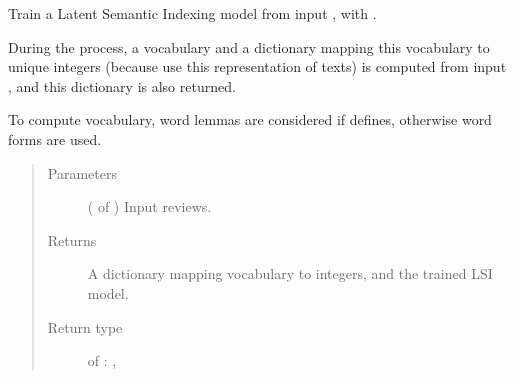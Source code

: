 \documentclass[letterpaper,10pt,english]{sphinxmanual}
\begin{document}
\begin{fulllineitems}
\label{\detokenize{learning:loacore.learning.lsi.lsi_model}}
Train a Latent Semantic Indexing model from input , with
.

During the process, a vocabulary and a dictionary mapping this vocabulary to unique integers
(because 
use this representation of texts) is computed from input , and this dictionary is also returned.

To compute vocabulary, word lemmas are considered if defines, otherwise word forms are used.
\begin{quote}\begin{description}
\item[{Parameters}] \leavevmode
{} ( of {\hyperref[\detokenize{classes:loacore.classes.classes.Review}]{}}) \textendash{} Input reviews.

\item[{Returns}] \leavevmode
A dictionary mapping vocabulary to integers, and the trained LSI model.

\item[{Return type}] \leavevmode

 of  : ,


\end{description}\end{quote}

\end{fulllineitems}

\end{document}
